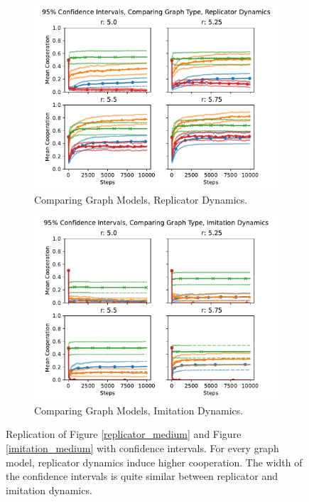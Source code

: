 \FloatBarrier 
\begin{figure}[!h]
  \begin{subfigure}[b]{0.45\textwidth}
    \includegraphics[width=1.1\textwidth]{images/Rep_gtype_med_CI.pdf}
    \caption{Comparing Graph Models, Replicator Dynamics.   }
    \label{rep_high_gtype_2}
  \end{subfigure}
  \hfill
  \begin{subfigure}[b]{0.45\textwidth}
    \includegraphics[width=1.1\textwidth]{images/ID_gtype_med_CI.pdf}
    \caption{Comparing Graph Models, Imitation Dynamics. }
    \label{ID_high_gtype_2}
  \end{subfigure}
  \caption{Replication of Figure  \ref{replicator_medium} and Figure \ref{imitation_medium} with confidence intervals. For every graph model, replicator dynamics induce higher cooperation. The width of the confidence intervals is quite similar between replicator and imitation dynamics. } \label{comparing_rep_ID_high}
\end{figure} 
\FloatBarrier

